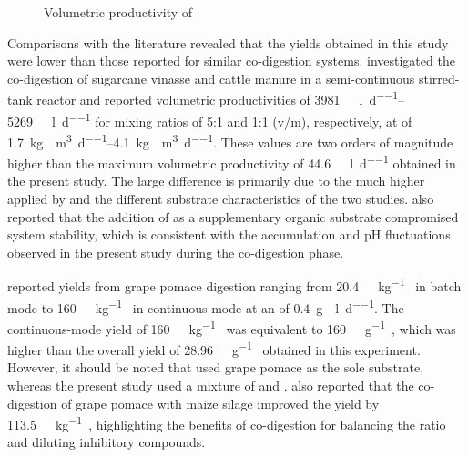 \begin{figure}[H]
    \caption{Volumetric productivity of }
    \label{graph:volumetric-productivity-ch4}
\end{figure}

\endgroup

Comparisons with the literature revealed that the  yields obtained in this study were lower than those reported for similar co-digestion systems. \textcite{aguiar2026} investigated the co-digestion of sugarcane vinasse and cattle manure in a semi-continuous stirred-tank reactor and reported volumetric  productivities of \qtyrange{3981}{5269}{\nml\CH\per\litre\per\day} for mixing ratios of 5:1 and 1:1 (v/m), respectively, at  of \qtyrange{1.7}{4.1}{\kg\VS\per\cubic\metre\per\day}. These values are two orders of magnitude higher than the maximum volumetric productivity of \qty{44.6}{\nml\CH\per\litre\per\day} obtained in the present study. The large difference is primarily due to the much higher  applied by \textcite{aguiar2026} and the different substrate characteristics of the two studies. \textcite{aguiar2026} also reported that the addition of  as a supplementary organic substrate compromised system stability, which is consistent with the  accumulation and pH fluctuations observed in the present study during the co-digestion phase.

\textcite{longanesi2016} reported  yields from grape pomace digestion ranging from \qty{20.4}{\NL\CH\per\kg\VS} in batch mode to \qty{160}{\NL\CH\per\kg\VS} in continuous mode at an  of \qty{0.4}{\g\VS\per\litre\per\day}. The continuous-mode yield of \qty{160}{\NL\CH\per\kg\VS} was equivalent to \qty{160}{\nml\CH\per\gram\VS}, which was higher than the overall yield of \qty{28.96}{\nml\CH\per\gram\VSfed} obtained in this experiment. However, it should be noted that \textcite{longanesi2016} used grape pomace as the sole substrate, whereas the present study used a mixture of  and . \textcite{longanesi2016} also reported that the co-digestion of grape pomace with maize silage improved the  yield by \qty{113.5}{\NL\CH\per\kg\VS}, highlighting the benefits of co-digestion for balancing the  ratio and diluting inhibitory compounds.

